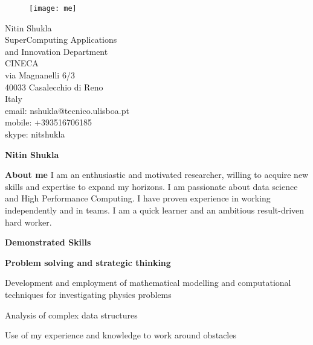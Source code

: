 \documentclass[a4paper,10pt,final]{memoir}
\newcommand{\Sep}{\vspace{0.8cm}}
\newcommand{\SmallSep}{\vspace{0.3cm}}
\newenvironment{AboutMe}
	{\ignorespaces\textbf{\color{RoyalBlue} About me}}
	{\Sep\ignorespacesafterend}
\newcommand{\CVSection}[1]
	{\Large\textbf{#1}\par
	\SmallSep\normalsize\normalfont}
\newcommand{\CVItem}[1]
	{\textbf{\color{RoyalBlue} #1}}
\begin{document}
\begin{figure}
	\hfill
	\texttt{[image: me]}
	\vspace{-7cm}
\end{figure}

\begin{flushright}\scriptsize
	Nitin Shukla\\
	SuperComputing Applications\\
	and Innovation Department\\
	CINECA\\
	via Magnanelli 6/3 \\
	40033 Casalecchio di Reno\\
	Italy\\
	email: nshukla@tecnico.ulisboa.pt\\
	mobile: +393516706185\\
	skype: nitshukla
\end{flushright}\normalsize
\framebreak


\Huge\bfseries {\color{RoyalBlue} Nitin Shukla} \\

\normalsize\normalfont

\begin{AboutMe}
I am an enthusiastic and motivated researcher, willing to acquire new skills and expertise to expand my horizons. I am passionate about data science and High Performance Computing. I have proven experience in working independently and in teams. I am a quick learner and an ambitious result-driven hard worker.
\end{AboutMe}

\vspace{-0.5cm}
\CVSection{Demonstrated Skills}

\CVItem{Problem solving and strategic thinking}
\begin{compactitem}[\color{RoyalBlue}$\circ$]
\item Development and employment of mathematical modelling and computational techniques for investigating physics problems
\item Analysis of complex data structures
\item Use of my experience and knowledge to work around obstacles
\end{compactitem}
\Sep
\end{document}
